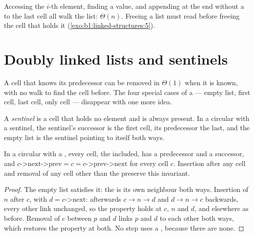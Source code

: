Accessing the $i$-th element, finding a value, and appending at the end without a  to the last cell all walk
the list: $\Theta(n)$. Freeing a list must read  before freeing the cell that holds it
(\cref{exo:b1:linked-structures:5}).

\section{Doubly linked lists and sentinels}\label{sec:b1:linked-structures:sentinel}

A cell that knows its predecessor can be removed in $\Theta(1)$ when it is known, with no walk to find the cell before.
The four special cases of a  --- empty list, first cell, last cell, only cell --- disappear with one
more idea.

\begin{definition}[Sentinel]\label{def:b1:linked-structures:sentinel}
A \emph{sentinel} is a cell that holds no element and is always present. In a circular  with a sentinel, the sentinel's successor is the first cell, its predecessor the last, and the empty list is the
sentinel pointing to itself both ways.
\end{definition}

\label{lst:b1:linked-structures:dlist}

\begin{proposition}\label{prop:b1:linked-structures:sentinel}
In a circular  with a , every cell, the  included, has a predecessor and a
successor, and $c\text{->next->prev} = c = c\text{->prev->next}$ for every cell $c$. Insertion after any cell and removal
of any cell other than the  preserve this invariant.
\end{proposition}

\begin{proof}
The empty list satisfies it: the  is its own neighbour both ways. Insertion of $n$ after $c$, with $d =
c\text{->next}$: afterwards $c \to n \to d$ and $d \to n \to c$ backwards, every other link unchanged, so the property
holds at $c$, $n$ and $d$, and elsewhere as before. Removal of $c$ between $p$ and $d$ links $p$ and $d$ to each other
both ways, which restores the property at both. No step uses a , because there are none.
\end{proof}

